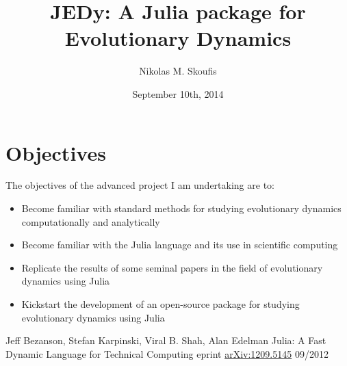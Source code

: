 \documentclass[a4paper,12pt]{article}
\begin{document}
\title{JEDy: A Julia package for Evolutionary Dynamics}
\author{Nikolas M. Skoufis}
\date{September 10th, 2014}

\maketitle

\section*{Objectives}

The objectives of the advanced project I am undertaking are to:

\begin{itemize}
        
    \item Become familiar with standard methods for studying evolutionary dynamics computationally and analytically
    \item Become familiar with the Julia \cite{julia} language and its use in scientific computing
    \item Replicate the results of some seminal papers in the field of evolutionary dynamics using Julia
    \item Kickstart the development of an open-source package for studying evolutionary dynamics using Julia

\end{itemize}

\begin{thebibliography}{9}

        Jeff Bezanson, Stefan Karpinski, Viral B. Shah, Alan Edelman
        Julia: A Fast Dynamic Language for Technical Computing
        eprint \href{http://arxiv.org/pdf/1209.5145v1.pdf}{arXiv:1209.5145}
        09/2012

\end{thebibliography}
\end{document}
